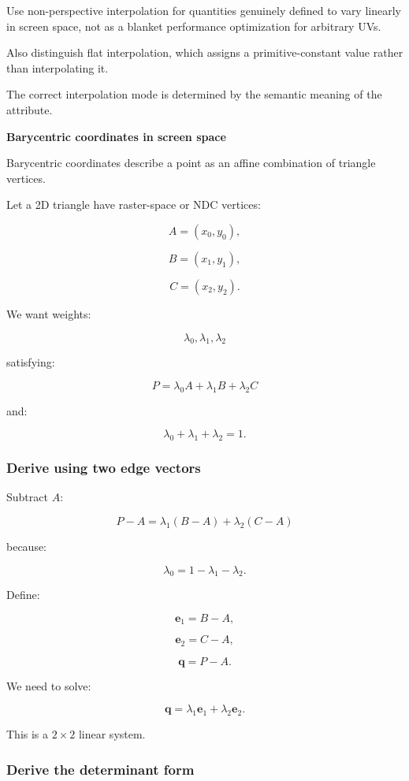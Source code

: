 Use non-perspective interpolation for quantities genuinely defined to vary linearly in screen space, not as a blanket performance optimization for arbitrary UVs.

Also distinguish flat interpolation, which assigns a primitive-constant value rather than interpolating it.

The correct interpolation mode is determined by the semantic meaning of the attribute.

\textbf{Barycentric coordinates in screen space}

Barycentric coordinates describe a point as an affine combination of triangle vertices.

Let a 2D triangle have raster-space or NDC vertices:

\[
 A=(x_0,y_0),
\]

\[
 B=(x_1,y_1),
\]

\[
 C=(x_2,y_2).
\]

We want weights:

\[
 \lambda_0,\lambda_1,\lambda_2
\]

satisfying:

\[
 \boxed{ P=\lambda_0A+\lambda_1B+\lambda_2C }
\]

and:

\[
 \boxed{ \lambda_0+\lambda_1+\lambda_2=1 }.
\]

\subsubsection{Derive using two edge vectors}\label{derive-using-two-edge-vectors}

Subtract \(A\):

\[
 P-A= \lambda_1(B-A)+\lambda_2(C-A)
\]

because:

\[
 \lambda_0=1-\lambda_1-\lambda_2.
\]

Define:

\[
 \mathbf e_1=B-A,
\]

\[
 \mathbf e_2=C-A,
\]

\[
 \mathbf q=P-A.
\]

We need to solve:

\[
 \mathbf q= \lambda_1\mathbf e_1+ \lambda_2\mathbf e_2.
\]

This is a \(2\times2\) linear system.

\subsubsection{Derive the determinant form}\label{derive-the-determinant-form}

